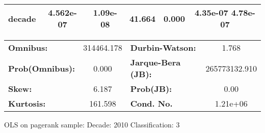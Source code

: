 \begin{center}
\begin{tabular}{lccccc}
\textbf{decade}             &    4.562e-07  &     1.09e-08     &    41.664  &         0.000        &      4.35e-07  4.78e-07       \\
\bottomrule
\end{tabular}
\begin{tabular}{lclc}
\textbf{Omnibus:}       & 314464.178 & \textbf{  Durbin-Watson:     } &       1.768    \\
\textbf{Prob(Omnibus):} &    0.000   & \textbf{  Jarque-Bera (JB):  } & 265773132.910  \\
\textbf{Skew:}          &    6.187   & \textbf{  Prob(JB):          } &        0.00    \\
\textbf{Kurtosis:}      &  161.598   & \textbf{  Cond. No.          } &    1.21e+06    \\
\bottomrule
\end{tabular}
\end{center}
\break
OLS on pagerank sample: Decade: 2010 Classification: 3
